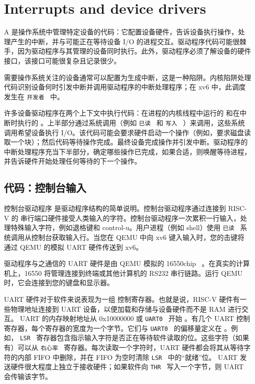 \documentclass[UTF8]{article}
\begin{document}
   \chapter{Interrupts and device drivers}   
    \label{CH:INTERRUPT}     

A
        是操作系统中管理特定设备的代码：它配置设备硬件，告诉设备执行操作，处理产生的中断，并与可能正在等待设备 I/O 的进程交互。驱动程序代码可能很棘手，因为驱动程序与其管理的设备同时执行。此外，驱动程序必须了解设备的硬件接口，该接口可能很复杂且记录很少。  

需要操作系统关注的设备通常可以配置为生成中断，这是一种陷阱。内核陷阱处理代码识别设备何时引发中断并调用驱动程序的中断处理程序；在 xv6 中，此调度发生在  {    \tt    开发者   }         中。  

许多设备驱动程序在两个上下文中执行代码：在进程的内核线程中运行的        和在中断时执行的       。上半部分通过系统调用（例如  {    \tt    已读   }  和  {    \tt    写入   } ）来调用，这些系统调用希望设备执行 I/O。该代码可能会要求硬件启动一个操作（例如，要求磁盘读取一个块）；然后代码等待操作完成。最终设备完成操作并引发中断。驱动程序的中断处理程序充当下半部分，确定哪些操作已完成，如果合适，则唤醒等待进程，并告诉硬件开始处理任何等待的下一个操作。  

   \section{代码：控制台输入  }     

控制台驱动程序        是驱动程序结构的简单说明。控制台驱动程序通过连接到 RISC-V 的        串行端口硬件接受人类输入的字符。控制台驱动程序一次累积一行输入，处理特殊输入字符，例如退格键和 control-u。用户进程（例如 shell）使用  {    \tt    已读   }  系统调用从控制台获取输入行。当您在 QEMU 中向 xv6 键入输入时，您的击键将通过 QEMU 的模拟 UART 硬件传送到 xv6。  

驱动程序与之通信的 UART 硬件是由 QEMU 模拟的 16550chip~    \cite{ns16550a}   。在真实的计算机上，16550 将管理连接到终端或其他计算机的 RS232 串行链路。运行 QEMU 时，它会连接到您的键盘和显示器。  

UART 硬件对于软件来说表现为一组        控制寄存器。也就是说，RISC-V 硬件有一些物理地址连接到 UART 设备，以便加载和存储与设备硬件而不是 RAM 进行交互。 UART 的内存映射地址从 0x10000000 或  {    \tt    UART0   }  开始
        。有几个 UART 控制寄存器，每个寄存器的宽度为一个字节。它们与  {    \tt    UART0   }  的偏移量定义在
        。例如，
  {    \tt    LSR   }  寄存器包含指示输入字符是否正在等待软件读取的位。这些字符（如果有）可以从
  {    \tt    右心率   }  寄存器。每次读取一个字符时，UART 硬件都会将其从等待字符的内部 FIFO 中删除，并在 FIFO 为空时清除  {    \tt    LSR   }  中的“就绪”位。 UART 发送硬件很大程度上独立于接收硬件；如果软件向  {    \tt    THR   }  写入一个字节，则 UART 会传输该字节。  
\end{document}
